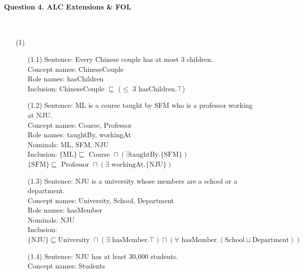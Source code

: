 \documentclass[12pt]{article}
\begin{document}
    \paragraph{Question 4. ALC Extensions \& FOL}~{}
    \\

    \begin{enumerate}
        \item[(1)]
        \begin{enumerate}
            \item[(1.1)]
            Sentence: Every Chinese couple has at most 3 children. \\
            Concept names: ChineseCouple \\
            Role names: hasChildren \\
            Inclusion: ChineseCouple $\sqsubseteq$ ($\leq$ 3 hasChildren.$\top$) \\
            \item[(1.2)]
            Sentence: ML is a course taught by SFM who is a professor working at NJU. \\
            Concept names: Course, Professor \\
            Role names: taughtBy, workingAt \\
            Nominals: ML, SFM, NJU \\
            Inclusion: $\{ \text{ML} \} \sqsubseteq \text{ Course } \sqcap (\exists \text{taughtBy}.\{ \text{SFM} \})$ \\
            $\{ \text{SFM} \} \sqsubseteq \text{ Professor } \sqcap (\exists \text{ workingAt}.\{ \text{NJU} \})$ \\
            \item[(1.3)]
            Sentence: NJU is a university whose members are a school or a department. \\
            Concept names: University, School, Department \\
            Role names: hasMember \\
            Nominals: NJU \\ 
            Inclusion: $\{ \text{NJU} \} \sqsubseteq \text{University } \sqcap (\exists \text{ hasMember}.\top) \sqcap (\forall \text{ hasMember}.(\text{School}\sqcup \text{Department}))$ \\
            \item[(1.4)]
            Sentence:  NJU has at least 30,000 students. \\
            Concept names: Students \\

\end{enumerate}
\end{enumerate}
\end{document}
